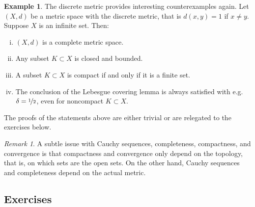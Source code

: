 \documentclass[12pt,openany]{book}
\theoremstyle{plain}
\theoremstyle{remark}
\newtheorem{remark}[thm]{Remark}
\theoremstyle{definition}
\theoremstyle{exercise}
\theoremstyle{example}
\newtheorem{example}[thm]{Example}
\newcommand{\exerciseref}[1]{\hyperref[#1]{Exercise~\ref*{#1}}}
\begin{document}
\begin{example}
The discrete metric provides interesting counterexamples again.
Let $(X,d)$ be a metric space with the discrete metric, that is $d(x,y) = 1$
if $x \not= y$.  Suppose
$X$ is an infinite set.  Then:
\begin{enumerate}[(i)]
\item $(X,d)$ is a complete metric space.
\item Any subset $K \subset X$ is closed and bounded.
\item A subset $K \subset X$ is compact if and only if it is a finite set.
\item The conclusion of the Lebesgue covering lemma is always satisfied with
e.g. $\delta = \nicefrac{1}{2}$, even for noncompact $K \subset X$.
\end{enumerate}
The proofs
of the statements above are either trivial or are relegated to the exercises
below.
\end{example}

\begin{remark}
A subtle issue with Cauchy sequences, completeness, compactness,
and convergence is that compactness and convergence only depend on the
topology, that is, on which sets are the open sets.  On the other hand,
Cauchy sequences and completeness depend on the actual metric.
\end{remark}

\subsection{Exercises}
\end{document}

